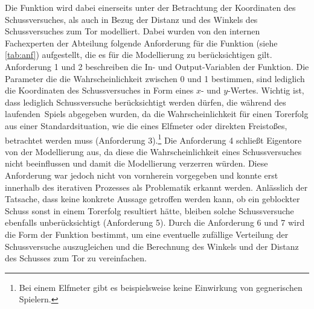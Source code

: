 Die Funktion wird dabei einerseits unter der Betrachtung der Koordinaten des Schussversuches, als auch in Bezug der Distanz und des Winkels des Schussversuches zum Tor modelliert. Dabei wurden von den internen Fachexperten der Abteilung folgende Anforderung für die Funktion (siehe \vref{tab:anf}) aufgestellt, die es für die Modellierung zu berücksichtigen gilt. Anforderung \textsf{1} und \textsf{2} beschreiben die In- und Output-Variablen der Funktion. Die Parameter die die Wahrscheinlichkeit zwischen 0 und 1 bestimmen, sind lediglich die Koordinaten des Schussversuches in Form eines $x$- und $y$-Wertes. Wichtig ist, dass lediglich Schussversuche berücksichtigt werden dürfen, die während des \glqq laufenden\grqq~Spiels abgegeben wurden, da die Wahrscheinlichkeit für einen Torerfolg aus einer Standardsituation, wie die eines Elfmeter oder direkten Freistoßes, betrachtet werden muss (Anforderung \textsf{3}).\footnote{Bei einem Elfmeter gibt es beispielsweise keine Einwirkung von gegnerischen Spielern.} Die Anforderung \textsf{4} schließt Eigentore von der Modellierung aus, da diese die Wahrscheinlichkeit eines Schussversuches nicht beeinflussen und damit die Modellierung verzerren würden. Diese Anforderung war jedoch nicht von vornherein vorgegeben und konnte erst innerhalb des iterativen Prozesses als Problematik erkannt werden. Anlässlich der Tatsache, dass keine konkrete Aussage getroffen werden kann, ob ein geblockter Schuss sonst in einem Torerfolg resultiert hätte, bleiben solche Schussversuche ebenfalls unberücksichtigt (Anforderung \textsf{5}). Durch die Anforderung \textsf{6} und \textsf{7} wird die Form der Funktion bestimmt, um eine eventuelle zufällige Verteilung der Schussversuche auszugleichen und die Berechnung des Winkels und der Distanz des Schusses zum Tor zu vereinfachen.

